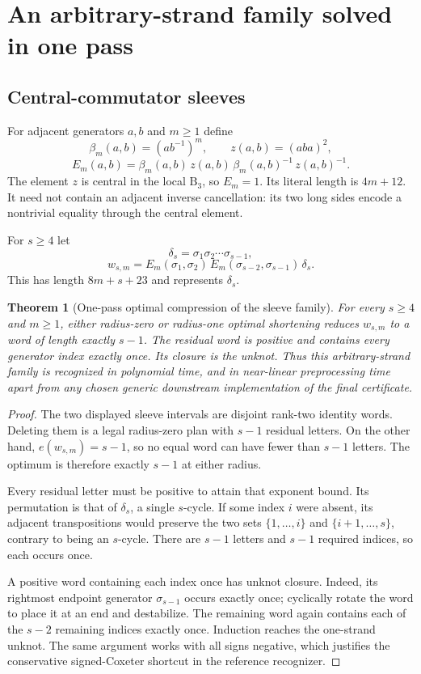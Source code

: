 \documentclass[11pt]{article}
\newtheorem{theorem}{Theorem}[section]
\theoremstyle{definition}
\theoremstyle{remark}
\newcommand{\B}{\mathrm B}
\begin{document}
\section{An arbitrary-strand family solved in one pass}
\subsection{Central-commutator sleeves}
For adjacent generators $a,b$ and $m\ge1$ define
\[
 \beta_m(a,b)=(ab^{-1})^m,\qquad z(a,b)=(aba)^2,
\]
\begin{equation}\label{eq:sleeve}
 E_m(a,b)=\beta_m(a,b)\,z(a,b)\,\beta_m(a,b)^{-1}\,z(a,b)^{-1}.
\end{equation}
The element $z$ is central in the local $\B_3$, so $E_m=1$. Its literal
length is $4m+12$. It need not contain an adjacent inverse cancellation:
its two long sides encode a nontrivial equality through the central element.

For $s\ge4$ let
\[
 \delta_s=\sigma_1\sigma_2\cdots\sigma_{s-1},
\]
\begin{equation}\label{eq:family}
 w_{s,m}=E_m(\sigma_1,\sigma_2)\,
 E_m(\sigma_{s-2},\sigma_{s-1})\,\delta_s.
\end{equation}
This has length $8m+s+23$ and represents $\delta_s$.

\begin{theorem}[One-pass optimal compression of the sleeve family]\label{thm:sleeves}
For every $s\ge4$ and $m\ge1$, either radius-zero or radius-one optimal
shortening reduces $w_{s,m}$ to a word of length exactly $s-1$. The residual
word is positive and contains every generator index exactly once. Its
closure is the unknot. Thus this arbitrary-strand family is recognized in
polynomial time, and in near-linear preprocessing time apart from any
chosen generic downstream implementation of the final certificate.
\end{theorem}
\begin{proof}
The two displayed sleeve intervals are disjoint rank-two identity words.
Deleting them is a legal radius-zero plan with $s-1$ residual letters. On
the other hand, $e(w_{s,m})=s-1$, so no equal word can have fewer than $s-1$
letters. The optimum is therefore exactly $s-1$ at either radius.

Every residual letter must be positive to attain that exponent bound. Its
permutation is that of $\delta_s$, a single $s$-cycle. If some index $i$ were
absent, its adjacent transpositions would preserve the two sets
$\{1,\ldots,i\}$ and $\{i+1,\ldots,s\}$, contrary to being an $s$-cycle.
There are $s-1$ letters and $s-1$ required indices, so each occurs once.

A positive word containing each index once has unknot closure. Indeed, its
rightmost endpoint generator $\sigma_{s-1}$ occurs exactly once; cyclically
rotate the word to place it at an end and destabilize. The remaining word
again contains each of the $s-2$ remaining indices exactly once. Induction
reaches the one-strand unknot. The same argument works with all signs
negative, which justifies the conservative signed-Coxeter shortcut in the
reference recognizer.
\end{proof}
\end{document}
